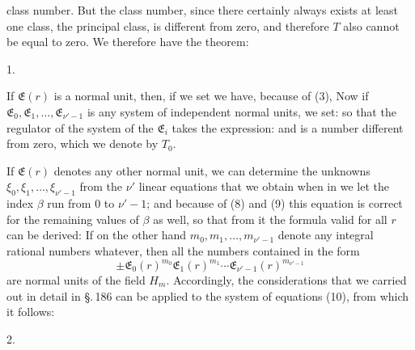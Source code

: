 class number. But the class number, since there
certainly always exists at least one class, the principal class, is
different from zero, and therefore $T$ also cannot be equal to zero.
We therefore have the theorem:

1. 

If $\mathfrak{E}(r)$ is a normal unit, then, if we set
we have, because of (3),
Now if $\mathfrak{E}_0, \mathfrak{E}_1, \ldots, \mathfrak{E}_{\nu'-1}$ is any system of independent
normal units, we set:
so that the regulator of the system of the $\mathfrak{E}_i$ takes the expression:
and is a number different from zero, which we denote by $T_0$.

If $\mathfrak{E}(r)$ denotes any other normal unit, we can determine
the unknowns $\xi_0, \xi_1, \ldots, \xi_{\nu'-1}$ from the $\nu'$ linear equations
 that we obtain when in
we let the index $\beta$ run from 0 to $\nu'-1$; and because of (8) and (9)
this equation is correct for the remaining values of $\beta$ as well,
so that from it the formula valid for all $r$ can be derived:
If on the other hand $m_0, m_1, \ldots, m_{\nu'-1}$ denote any integral
rational numbers whatever, then all the numbers contained in the form
\[
\pm\mathfrak{E}_0(r)^{m_0}\mathfrak{E}_1(r)^{m_1}\cdots\mathfrak{E}_{\nu'-1}(r)^{m_{\nu'-1}}
\]
are normal units of the field $H_m$. Accordingly, the considerations
that we carried out in detail in \S.\,186 can be applied to the
system of equations (10), from which it follows:

2. 
